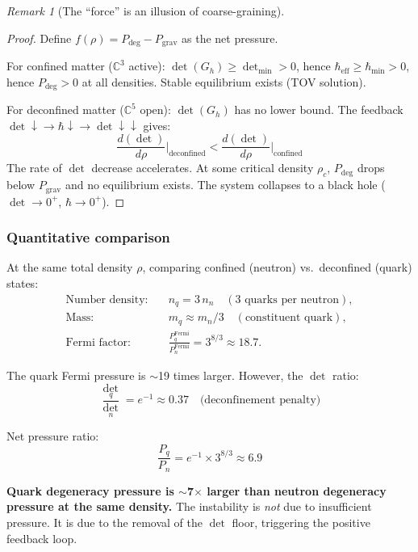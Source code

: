 \documentclass[12pt]{article}
\theoremstyle{remark}
\newtheorem{remark}[theorem]{Remark}
\theoremstyle{definition}
\newcommand{\CC}{\mathbb{C}}
\begin{document}
\begin{remark}[The ``force'' is an illusion of coarse-graining]
\begin{proof}
Define $f(\rho) = P_\text{deg} - P_\text{grav}$ as the net pressure.

For confined matter ($\CC^3$ active):
$\det(G_h) \geq \det_\text{min} > 0$, hence $\hbar_\text{eff} \geq \hbar_\text{min} > 0$, hence $P_\text{deg} > 0$ at all densities. Stable equilibrium exists (TOV solution).

For deconfined matter ($\CC^5$ open):
$\det(G_h)$ has no lower bound. The feedback $\det \downarrow \to \hbar \downarrow \to \det \downarrow\downarrow$ gives:
\begin{equation}
\frac{d(\det)}{d\rho}\bigg|_\text{deconfined} < \frac{d(\det)}{d\rho}\bigg|_\text{confined}
\end{equation}
The rate of $\det$ decrease accelerates. At some critical density $\rho_c$, $P_\text{deg}$ drops below $P_\text{grav}$ and no equilibrium exists. The system collapses to a black hole ($\det \to 0^+$, $\hbar \to 0^+$).
\end{proof}

\subsubsection{Quantitative comparison}

At the same total density $\rho$, comparing confined (neutron) vs.\ deconfined (quark) states:
\begin{align}
\text{Number density:} &\quad n_q = 3\,n_n \quad (\text{3 quarks per neutron}), \\
\text{Mass:} &\quad m_q \approx m_n/3 \quad (\text{constituent quark}), \\
\text{Fermi factor:} &\quad \frac{P_q^\text{Fermi}}{P_n^\text{Fermi}} = 3^{8/3} \approx 18.7.
\end{align}

The quark Fermi pressure is $\sim$19 times larger. However, the $\det$ ratio:
\begin{equation}
\frac{\det_q}{\det_n} = e^{-1} \approx 0.37 \quad \text{(deconfinement penalty)}
\end{equation}

Net pressure ratio:
\begin{equation}
\frac{P_q}{P_n} = e^{-1} \times 3^{8/3} \approx 6.9
\end{equation}

\textbf{Quark degeneracy pressure is $\sim$7$\times$ larger than neutron degeneracy pressure at the same density.} The instability is \emph{not} due to insufficient pressure. It is due to the removal of the $\det$ floor, triggering the positive feedback loop.


\end{remark}
\end{document}
